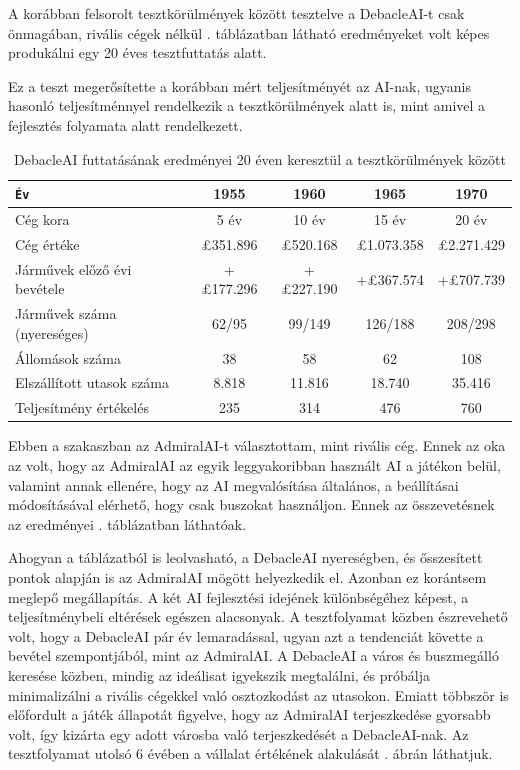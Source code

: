 
A korábban felsorolt tesztkörülmények között tesztelve a DebacleAI-t csak önmagában, rivális cégek nélkül . táblázatban látható eredményeket volt képes produkálni egy 20 éves tesztfuttatás alatt.

Ez a teszt megerősítette a korábban mért teljesítményét az AI-nak, ugyanis hasonló teljesítménnyel rendelkezik a tesztkörülmények alatt is, mint amivel a fejlesztés folyamata alatt rendelkezett.

\begin{table}
	\centering
	\caption{DebacleAI futtatásának eredményei 20 éven keresztül a tesztkörülmények között}
	\label{tab:debacle20} 
	\smallskip
	\begin{tabular}{|l || c | c | c | c |} 
		\hline
		\texttt{Év} & 1955 & 1960 & 1965 & 1970 \\ 
		\hline\hline
		Cég kora & 5 év & 10 év & 15 év & 20 év  \\ 
		\hline
		Cég értéke &  \pounds 351.896 & \pounds 520.168  & \pounds 1.073.358 & \pounds 2.271.429\\
		\hline
		Járművek előző évi bevétele & +\pounds 177.296 & +\pounds 227.190  & +\pounds 367.574 & +\pounds 707.739 \\
		\hline
		Járművek száma (nyereséges) & 62/95 & 99/149 & 126/188 & 208/298 \\
		\hline
		Állomások száma & 38 & 58 & 62 & 108 \\ 
		\hline
		Elszállított utasok száma & 8.818 & 11.816 & 18.740 & 35.416  \\
		\hline
		Teljesítmény értékelés & 235 & 314 & 476 & 760 \\ 
		\hline
	\end{tabular}
\end{table}


Ebben a szakaszban az AdmiralAI-t választottam, mint rivális cég. Ennek az oka az volt, hogy az AdmiralAI az egyik leggyakoribban használt AI a játékon belül, valamint annak ellenére, hogy az AI megvalósítása általános, a beállításai módosításával elérhető, hogy csak buszokat használjon. Ennek az összevetésnek az eredményei . táblázatban láthatóak.

Ahogyan a táblázatból is leolvasható, a DebacleAI nyereségben, és ősszesített pontok alapján is az AdmiralAI mögött helyezkedik el. Azonban ez korántsem meglepő megállapítás. A két AI fejlesztési idejének különbségéhez képest, a teljesítménybeli eltérések egészen alacsonyak. A tesztfolyamat közben észrevehető volt, hogy a DebacleAI pár év lemaradással, ugyan azt a tendenciát követte a bevétel szempontjából, mint az AdmiralAI. A DebacleAI a város és buszmegálló keresése közben, mindig az ideálisat igyekszik megtalálni, és próbálja minimalizálni a rivális cégekkel való osztozkodást az utasokon. Emiatt többször is előfordult a játék állapotát figyelve, hogy az AdmiralAI terjeszkedése gyorsabb volt, így kizárta egy adott városba való terjeszkedését a DebacleAI-nak. Az tesztfolyamat utolsó 6 évében a vállalat értékének alakulását . ábrán láthatjuk.


